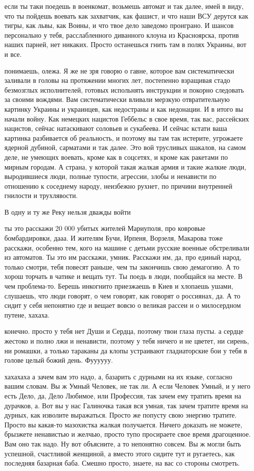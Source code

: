 если ты таки поедешь в военкомат, возьмешь автомат и так далее, имей в виду,
что ты пойдешь воевать как захватчик, как фашист, и что наши ВСУ дерутся как
тигры, как львы, как Воины, и что твое дело заведомо проиграно. И шансов
персонально у тебя, расслабленного диванного клоуна из Красноярска, против
наших парней, нет никаких. Просто останешься гнить там в полях Украины, вот и
все.

понимаешь, олежа. Я же не зря говорю о гавне, которое вам систематически
заливали в головы на протяжении многих лет, постепенно взращивая стадо
безмозглых исполнителей, готовых испольнять инструкции и покорно следовать за
своими вождями. Вам систематически вливали мерзкую отвратительную картинку
Украины и украинцев, как недостраны и как недонации. И в итого вы начали войну.
Как немецких нацистов Геббельс в свое время, так вас, рассейских нацистов,
сейчас натаскивают соловьев и сукабеева. И сейчас кстати ваша картинка
разбивается об реальность, и поэтому вы там так истерите, угрожаете ядерной
дубиной, сарматами и так далее. Это вой трусливых шакалов, на самом деле, не
умеющих воевать, кроме как в соцсетях, и кроме как ракетами по мирным городам.
А страна, у которой такая жалкая армия и такие жалкие люди, выродившиеся люди,
полные тупости, агрессии, злобы и ненависти по отношению к соседнему народу,
неизбежно рухнет, по причини внутренней гнилости и трухлявости.

В одну и ту же Реку нельзя дважды войти


ты это расскажи 20 000 убитых жителей Мариуполя, про ковровые бомбардировки,
дааа. И жителям Бучи, Ирпеня, Ворзеля, Макарова тоже расскажи, особенно тем,
кого на машине с детьми русские военные обстреливали из автоматов. Ты это им
расскажи, умник. Расскажи им, да, про единый народ, только смотри, тебя повесят
раньше, чем ты закончишь свою демагогию. А то хорош торчать в чатике и вещать
тут. Ты поедь в люди, пообщайся на месте. В чем проблема-то. Берешь инкогнито
приезжаешь в Киев и хлопаешь ушами, слушаешь, что люди говорят, о чем говорят,
как говорят о россиянах, да. А то сидит у себя непонятно где и вещает вовсю о
великая рассеи и о милосердном путене, хахаха.

конечно. просто у тебя нет Души и Сердца, поэтому твои глаза пусты. а сердце
жестоко и полно лжи и ненависти, поэтому у тебя ничего и не цветет, ни сирень,
ни ромашки, а только тараканы да клопы устраивают гладиаторские бои у тебя в
голове целый божий день. Фуууууу.

хахахаха а зачем вам это надо, а, базарить с дурными на их языке, согласно
вашим словам. Вы ж Умный Человек, не так ли. А если Человек Умный, и у него
есть Дело, да, Дело Любимое, или Профессия, так зачем ему тратить время на
дурачков, а. Вот вы у нас Галиночка такая вся умная, так зачем тратите время на
дурных, как изволите выражаться. Просто же попусту свою энергию тратите. Просто
вы какая-то мазохистка жалкая получается. Ничего доказать не можете, брызжете
ненавистью и желчью, просто тупо просираете свое время драгоценное. Вам оно так
надо. Ну вот объясните, а то непонятно совсем. Вы ж могли быть успешной,
счастливой женщиной, а вместо этого сидите тут и ругаетесь, как последняя
базарная баба. Смешно просто, знаете, на вас со стороны смотреть.

